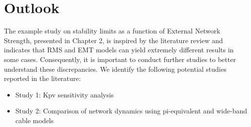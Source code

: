 \documentclass{report}
\begin{document}




\chapter{Outlook}
The example study on stability limits as a function of External Network Strength, presented in Chapter 2, is inspired by the literature review and indicates that RMS and EMT models can yield extremely different results in some cases. Consequently, it is important to conduct further studies to better understand these discrepancies. We identify the following potential studies reported in the literature:
\begin{itemize}
    \item Study 1: Kpv sensitivity analysis
    \item Study 2: Comparison of network dynamics using pi-equivalent and wide-band cable models
\end{itemize}
\end{document}
